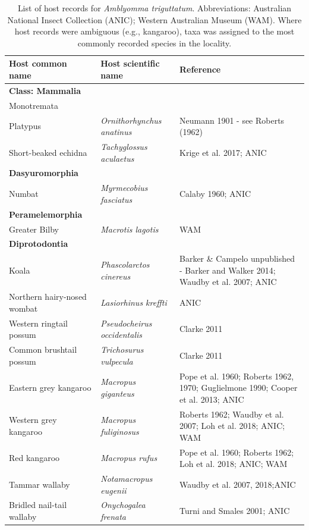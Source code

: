\documentclass[a4paper, nobind]{templates/ociamthesis}
\begin{document}
\begin{longtable}[t]{>{\raggedright\arraybackslash}p{3cm}>{}l>{\raggedright\arraybackslash}p{6cm}}
\caption[Host records for the ornate kangaroo tick.]{\label{tab:T2atrig}List of host records for \textit{Amblyomma triguttatum}. Abbreviations: Australian National Insect Collection (ANIC); Western Australian Museum (WAM). Where host records were ambiguous (e.g., kangaroo), taxa was assigned to the most commonly recorded species in the locality.}\\
\toprule
Host common name & Host scientific name & Reference\\
\midrule
\textbf{Class: Mammalia} & \em{\textbf{}} & \textbf{}\\
Monotremata & \em{} & \\
Platypus & \em{Ornithorhynchus anatinus} & Neumann 1901 - see Roberts (1962)\\
Short-beaked echidna & \em{Tachyglossus aculaetus} & Krige et al. 2017; ANIC\\
\textbf{Dasyuromorphia} & \em{\textbf{}} & \textbf{}\\
Numbat & \em{Myrmecobius fasciatus} & Calaby 1960; ANIC\\
\textbf{Peramelemorphia} & \em{\textbf{}} & \textbf{}\\
Greater Bilby & \em{Macrotis lagotis} & WAM\\
\textbf{Diprotodontia} & \em{\textbf{}} & \textbf{}\\
Koala & \em{Phascolarctos cinereus} & Barker \& Campelo unpublished - Barker and Walker 2014; Waudby et al. 2007; ANIC\\
Northern hairy-nosed wombat & \em{Lasiorhinus kreffti} & ANIC\\
Western ringtail possum & \em{Pseudocheirus occidentalis} & Clarke 2011\\
Common brushtail possum & \em{Trichosurus vulpecula} & Clarke 2011\\
Eastern grey kangaroo & \em{Macropus giganteus} & Pope et al. 1960; Roberts 1962, 1970; Guglielmone 1990; Cooper et al. 2013; ANIC\\
Western grey kangaroo & \em{Macropus fuliginosus} & Roberts 1962; Waudby et al. 2007; Loh et al. 2018; ANIC; WAM\\
Red kangaroo & \em{Macropus rufus} & Pope et al. 1960; Roberts 1962; Loh et al. 2018; ANIC; WAM\\
Tammar wallaby & \em{Notamacropus eugenii} & Waudby et al. 2007, 2018;ANIC\\
Bridled nail-tail wallaby & \em{Onychogalea frenata} & Turni and Smales 2001; ANIC\\

\end{longtable}
\end{document}

